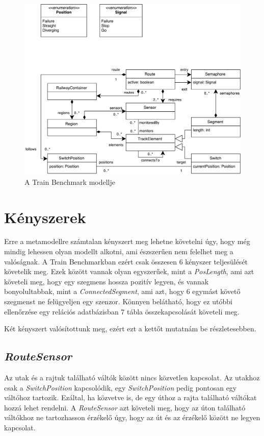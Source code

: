 \begin{figure}
	\includegraphics[width=\linewidth, keepaspectratio]{figures/model.pdf}
	\caption{A Train Benchmark modellje}
	\label{fig:ModelDiagram}
\end{figure}

\section{Kényszerek}

Erre a metamodellre számtalan kényszert meg lehetne követelni úgy, hogy még mindig lehessen olyan modellt alkotni, ami észszerűen nem felelhet meg a valóságnak. A Train Benchmarkban ezért csak összesen 6 kényszer teljesülését követelik meg. Ezek között vannak olyan egyszerűek, mint a \emph{PosLength}, ami azt követeli meg, hogy egy szegmens hossza pozitív legyen, és vannak bonyolultabbak, mint a \emph{ConnectedSegment}, ami azt, hogy 6 egymást követő szegmenst ne felügyeljen egy szenzor. Könnyen belátható, hogy ez utóbbi ellenőrzése egy relációs adatbázisban 7 tábla összekapcsolását követeli meg.

Két kényszert valósítottunk meg, ezért ezt a kettőt mutatnám be részletesebben.

\subsection{\emph{RouteSensor}}

Az utak és a rajtuk található váltók között nincs közvetlen kapcsolat. Az utakhoz csak a \emph{SwitchPosition} kapcsolódik, egy \emph{SwitchPosition} pedig pontosan egy váltóhoz tartozik. Ezáltal, ha közvetve is, de egy úthoz a rajta található váltókat hozzá lehet rendelni. A \emph{RouteSensor} azt követeli meg, hogy az úton található váltókhoz ne tartozhasson érzékelő úgy, hogy az út és az érzékelő között ne legyen kapcsolat.

